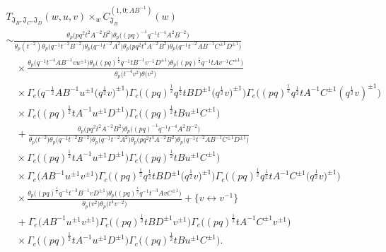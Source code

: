 \documentclass[a4paper,12pt]{article}
\begin{document}
\begin{gather}
T_{{\mathfrak J}_B, {\mathfrak J}_C,{\mathfrak J}_D}(w,u,v)\times_w C^{(1,0;AB^{-1})}_{{\mathfrak J}_B}(w)\nonumber\\
\sim\frac{\theta_p\big(pq^2t^2A^{-2}B^2\big)
\theta_p\big((pq)^{-1}q^{-1}t^{-4}A^2B^{-2}\big)}
{\theta_p(t^{-2})\theta_p\big(q^{-1}t^{-2}B^{-2}\big)\theta_p\big(q^{-1}t^{-2}A^2\big)\theta_p\big(pq^2t^4A^{-2}B^2\big)
\theta_p\big(q^{-1}t^{-2}AB^{-1}C^{\pm1}D^{\pm1}\big)}\nonumber\\
\quad{}\times\frac{\theta_p\big(q^{-1}t^{-4}AB^{-1}vu^{\pm1}\big)
\theta_p\big((pq)^\frac{1}{2}q^{-1}tB^{-1}v^{-1}D^{\pm1}\big)
\theta_p\big((pq)^\frac{1}{2}q^{-1}tAv^{-1}C^{\pm1}\big)}
{\theta_p\big(t^{-4}v^2\big)\theta\big(v^2\big)}\nonumber\\
\quad{}\times\Gamma_e\big(q^{-\frac{1}{2}}A B^{-1}u^{\pm1}\big(q^\frac{1}{2}v\big)^{\pm1}\big)
\Gamma_e\big((pq)^\frac{1}{2}q^\frac{1}{2}t B D^{\pm1}\big(q^\frac{1}{2}v\big)^{\pm1}\big)
\Gamma_e\big((pq)^{\frac{1}{2}}q^\frac{1}{2}tA^{-1}C^{\pm1}(q^\frac{1}{2}v)^{\pm1}\big)
\nonumber\\
\quad{}\times\Gamma_e\big((pq)^\frac{1}{2}tA^{-1}u^{\pm1}D^{\pm1}\big)
\Gamma_e\big((pq)^\frac{1}{2}t B u^{\pm1}C^{\pm1}\big)\nonumber\\
\quad{}+\frac{\theta_p\big(pq^2t^2A^{-2}B^2\big)
\theta_p\big((pq)^{-1}q^{-1}t^{-4}A^2B^{-2}\big)}
{\theta_p\big(t^{-2}\big)\theta_p\big(q^{-1}t^{-2}B^{-2}\big)\theta_p\big(q^{-1}t^{-2}A^2\big)\theta_p\big(pq^2t^4A^{-2}B^2\big)
\theta_p\big(q^{-1}t^{-2}AB^{-1}C^{\pm1}D^{\pm1}\big)}\nonumber\\
\quad{}\times\Gamma_e\big((pq)^\frac{1}{2}t A^{-1}u^{\pm1}D^{\pm1}\big)
\Gamma_e\big((pq)^\frac{1}{2}t B u^{\pm1}C^{\pm1}\big)
\nonumber\\
\quad{}\times\Gamma_e\big(AB^{-1}u^{\pm1}v^{\pm1}\big)\Gamma_e\big((pq)^\frac{1}{2}q^\frac{1}{2}t B D^{\pm1}\big(q^\frac{1}{2}v\big)^{\pm1}\big)
\Gamma_e\big((pq)^{\frac{1}{2}}q^\frac{1}{2}tA^{-1}C^{\pm1}\big(q^\frac{1}{2}v\big)^{\pm1}\big)
\nonumber\\
\quad{}\times\frac{\theta_p\big((pq)^\frac{1}{2}q^{-1}t^{-3}B^{-1}v D^{\pm1}\big)\theta_p\big((pq)^\frac{1}{2}q^{-1}t^{-3}A v C^{\pm1}\big)}
{\theta_p\big(v^2\big)\theta_p\big(t^4v^{-2}\big)}+\big\{v\leftrightarrow v^{-1}\big\}\nonumber\\
 \quad{}+\Gamma_e\big(A B^{-1}u^{\pm1}v^{\pm1}\big)\Gamma_e\big((pq)^{\frac{1}{2}}t B D^{\pm1}v^{\pm1}\big)
\Gamma_e\big((pq)^{\frac{1}{2}}t A^{-1}C^{\pm1}v^{\pm1}\big)\nonumber\\
\quad{}\times
\Gamma_e\big((pq)^\frac{1}{2}tA^{-1}u^{\pm1}D^{\pm1}\big)\Gamma_e\big((pq)^\frac{1}{2}t B u^{\pm1}C^{\pm1}\big).
\end{gather}
\end{document}

